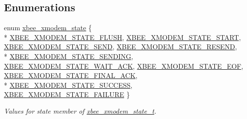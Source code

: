 \subsection*{Enumerations}
\begin{DoxyCompactItemize}
\item 
enum \hyperlink{group__util__xmodem_gaca3fc49d80cd9afccc34812b2985484f}{xbee\-\_\-xmodem\-\_\-state} \{ \\*
\hyperlink{group__util__xmodem_ggaca3fc49d80cd9afccc34812b2985484fa0a84e83220282fadef6bcee5b42fd02f}{X\-B\-E\-E\-\_\-\-X\-M\-O\-D\-E\-M\-\_\-\-S\-T\-A\-T\-E\-\_\-\-F\-L\-U\-S\-H}, 
\hyperlink{group__util__xmodem_ggaca3fc49d80cd9afccc34812b2985484fa35f508b4cdce4d950e327aa7fe73e9df}{X\-B\-E\-E\-\_\-\-X\-M\-O\-D\-E\-M\-\_\-\-S\-T\-A\-T\-E\-\_\-\-S\-T\-A\-R\-T}, 
\hyperlink{group__util__xmodem_ggaca3fc49d80cd9afccc34812b2985484fa53ac0249ccdeb684c78baee336d65187}{X\-B\-E\-E\-\_\-\-X\-M\-O\-D\-E\-M\-\_\-\-S\-T\-A\-T\-E\-\_\-\-S\-E\-N\-D}, 
\hyperlink{group__util__xmodem_ggaca3fc49d80cd9afccc34812b2985484facb6bc4306d97a0b11b1ad879725df3b5}{X\-B\-E\-E\-\_\-\-X\-M\-O\-D\-E\-M\-\_\-\-S\-T\-A\-T\-E\-\_\-\-R\-E\-S\-E\-N\-D}, 
\\*
\hyperlink{group__util__xmodem_ggaca3fc49d80cd9afccc34812b2985484fac9e012359b6cf5f45ea6f2f5f9d76d4d}{X\-B\-E\-E\-\_\-\-X\-M\-O\-D\-E\-M\-\_\-\-S\-T\-A\-T\-E\-\_\-\-S\-E\-N\-D\-I\-N\-G}, 
\hyperlink{group__util__xmodem_ggaca3fc49d80cd9afccc34812b2985484fad7ce55b9d8ec65fa4f8410590cb67eaa}{X\-B\-E\-E\-\_\-\-X\-M\-O\-D\-E\-M\-\_\-\-S\-T\-A\-T\-E\-\_\-\-W\-A\-I\-T\-\_\-\-A\-C\-K}, 
\hyperlink{group__util__xmodem_ggaca3fc49d80cd9afccc34812b2985484fac0f165be362c1a05448acb718d15299c}{X\-B\-E\-E\-\_\-\-X\-M\-O\-D\-E\-M\-\_\-\-S\-T\-A\-T\-E\-\_\-\-E\-O\-F}, 
\hyperlink{group__util__xmodem_ggaca3fc49d80cd9afccc34812b2985484fae1a85fb72853aa9b4b2b1ef7734315a4}{X\-B\-E\-E\-\_\-\-X\-M\-O\-D\-E\-M\-\_\-\-S\-T\-A\-T\-E\-\_\-\-F\-I\-N\-A\-L\-\_\-\-A\-C\-K}, 
\\*
\hyperlink{group__util__xmodem_ggaca3fc49d80cd9afccc34812b2985484fac17280139c0e7d88f3c6371bda3f7123}{X\-B\-E\-E\-\_\-\-X\-M\-O\-D\-E\-M\-\_\-\-S\-T\-A\-T\-E\-\_\-\-S\-U\-C\-C\-E\-S\-S}, 
\hyperlink{group__util__xmodem_ggaca3fc49d80cd9afccc34812b2985484faf97088a6d2705daabd8e016542aa112e}{X\-B\-E\-E\-\_\-\-X\-M\-O\-D\-E\-M\-\_\-\-S\-T\-A\-T\-E\-\_\-\-F\-A\-I\-L\-U\-R\-E}
 \}
\begin{DoxyCompactList}\small\item\em Values for {\ttfamily state} member of \hyperlink{structxbee__xmodem__state__t}{xbee\-\_\-xmodem\-\_\-state\-\_\-t}. \end{DoxyCompactList}\end{DoxyCompactItemize}
